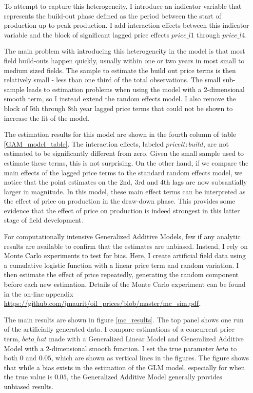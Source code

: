 \documentclass[12pt]{article}
\begin{document}
To attempt to capture this heterogeneity, I introduce an indicator variable that represents the build-out phase defined as the period between the start of production up to peak production. I add interaction effects between this indicator variable and the block of significant lagged price effects $price\_l1$ through $price\_l4$.

The main problem with introducing this heterogeneity in the model is that most field build-outs happen quickly, usually within one or two years in most small to medium sized fields. The sample to estimate the build out price terms is then relatively small - less than one third of the total observations. The small sub-sample leads to estimation problems when using the model with a 2-dimensional smooth term, so I instead extend the random effects model. I also remove the block of 5th through 8th year lagged price terms that could not be shown to increase the fit of the model.

The estimation results for this model are shown in the fourth column of table \ref{GAM_model_table}. The interaction effects, labeled $price lt:build$, are not estimated to be significantly different from zero. Given the small sample used to estimate these terms, this is not surprising. On the other hand, if we compare the main effects of the lagged price terms to the standard random effects model, we notice that the point estimates on the 2nd, 3rd and 4th lags are now subsantially larger in magnitude. In this model, these main effect terms can be interpreted as the effect of price on production in the draw-down phase. This provides some evidence that the effect of price on production is indeed strongest in this latter stage of field development.

For computationally intensive Generalized Additive Models, few if any analytic results are available to confirm that the estimates are unbiased.  Instead, I rely on Monte Carlo experiments to test for bias.  Here, I create artificial field data using a cumulative logistic function with a linear price term and random variation. I then estimate the effect of price repeatedly, generating the random component before each new estimation. Details of the Monte Carlo experiment can be found in the on-line appendix \url{https://github.com/jmaurit/oil_prices/blob/master/mc_sim.pdf}.  

The main results are shown in figure \ref{mc_results}.  The top panel shows one run of the artificially generated data. I compare estimations of a concurrent price term, $beta\_hat$ made with a Generalized Linear Model and Generalized Additive Model with a 2-dimensional smooth function.  I set the true parameter $beta$ to both $0$ and $0.05$, which are shown as vertical lines in the figures.  The figure shows that while a bias exists in the estimation of the GLM model, especially for when the true value is $0.05$, the Generalized Additive Model generally provides unbiased results. 
\end{document}
